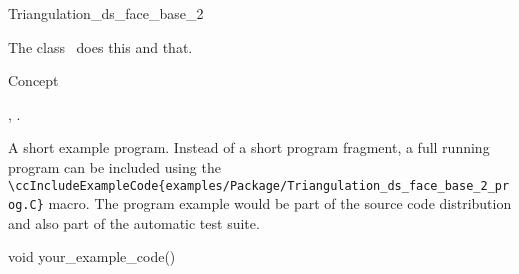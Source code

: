 

\begin{ccRefClass}{Triangulation_ds_face_base_2}  %


\ccDefinition
  
The class \ccRefName\ does this and that.


\ccIsModel

Concept

\ccTypes


\ccCreation
{}  %


\ccOperations


\ccSeeAlso

,
.

\ccExample

A short example program.
Instead of a short program fragment, a full running program can be
included using the 
\verb|\ccIncludeExampleCode{examples/Package/Triangulation_ds_face_base_2_prog.C}| 
macro. The program example would be part of the source code distribution and
also part of the automatic test suite.

\begin{ccExampleCode}
void your_example_code() {
}
\end{ccExampleCode}


\end{ccRefClass}


